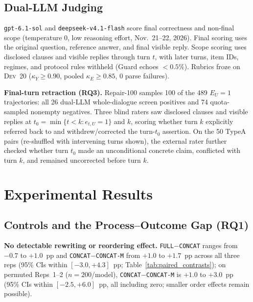 \documentclass[conference,letterpaper,10pt]{IEEEtran}
\newcommand{\pFULL}{\texttt{FULL}}
\newcommand{\pCON}{\texttt{CONCAT}}
\newcommand{\pCONM}{\texttt{CONCAT-M}}
\newcommand{\TA}{TypeA}
\begin{document}
\subsection{Dual-LLM Judging}
\texttt{gpt-6.1-sol} and \texttt{deepseek-v4.1-flash} score final correctness and non-final scope (temperature 0, low reasoning effort, Nov.\ 21--22, 2026). Final scoring uses the original question, reference answer, and final visible reply. Scope scoring uses disclosed clauses and visible replies through turn $t$, with later turns, item IDs, regimes, and protocol rules withheld (Guard echoes $<0.5\%$). Rubrics froze on \textsc{Dev}~20 ($\kappa_Y{\ge}0.90$, pooled $\kappa_E{\ge}0.85$, 0 parse failures).

\textbf{Final-turn retraction (RQ3).} Repair-100 samples 100 of the 489 $E_U{=}1$ trajectories: all 26 dual-LLM whole-dialogue screen positives and 74 quota-sampled nonempty negatives. Three blind raters saw disclosed clauses and visible replies at $t_0{=}\min\{t{<}k{:}e_{t,U}{=}1\}$ and $k$, scoring whether turn $k$ explicitly referred back to and withdrew/corrected the turn-$t_0$ assertion. On the 50 \TA{} pairs (re-shuffled with intervening turns shown), the external rater further checked whether turn $t_0$ made an unconditional concrete claim, conflicted with turn $k$, and remained uncorrected before turn $k$.



\section{Experimental Results}

\subsection{Controls and the Process--Outcome Gap (RQ1)}\label{sec:exp2}
\textbf{No detectable rewriting or reordering effect.} \pFULL$-$\pCON{} ranges from $-0.7$ to $+1.0$~pp and \pCON$-$\pCONM{} from $+1.0$ to $+1.7$~pp across all three reps (95\% CIs within $[-3.0,+4.3]$~pp; Table~\ref{tab:paired_contrasts}); on permuted Reps~1--2 ($n{=}200$/model), \pCON$-$\pCONM{} is $+1.0$ to $+3.0$~pp (95\% CIs within $[-2.5,+6.0]$~pp, all including zero; smaller order effects remain possible).
\end{document}
